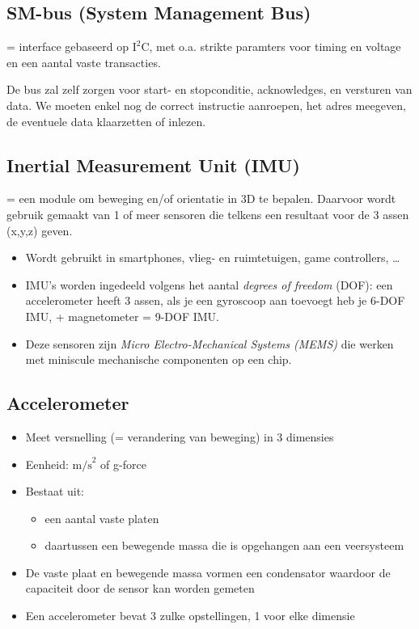 \documentclass{article}
\begin{document}
\subsection{SM-bus (System Management Bus)}
= interface gebaseerd op $\text{I}^2\text{C}$, met o.a. strikte paramters voor timing en voltage en een aantal vaste transacties.

De bus zal zelf zorgen voor start- en stopconditie, acknowledges, en versturen van data. 
We moeten enkel nog de correct instructie aanroepen, het adres meegeven, de eventuele data klaarzetten of inlezen.

\subsection{Inertial Measurement Unit (IMU)}
= een module om beweging en/of orientatie in 3D te bepalen. 
Daarvoor wordt gebruik gemaakt van 1 of meer sensoren die telkens een resultaat voor de 3 assen (x,y,z) geven.

\begin{itemize}
    \item Wordt gebruikt in smartphones, vlieg- en ruimtetuigen, game controllers, \dots
    \item IMU's worden ingedeeld volgens het aantal \textit{degrees of freedom} (DOF):
    een accelerometer heeft 3 assen, als je een gyroscoop aan toevoegt heb je 6-DOF IMU, + magnetometer = 9-DOF IMU.
    \item Deze sensoren zijn \textit{Micro Electro-Mechanical Systems (MEMS)} die werken met miniscule mechanische componenten op een chip.
\end{itemize}

\subsection{Accelerometer}
\begin{itemize}
    \item Meet versnelling (= verandering van beweging) in 3 dimensies
    \item Eenheid: $\text{m/s}^2$ of g-force
    \item Bestaat uit:
    \begin{itemize}
        \item een aantal vaste platen
        \item daartussen een bewegende massa die is opgehangen aan een veersysteem
    \end{itemize}
    \item De vaste plaat en bewegende massa vormen een condensator waardoor de capaciteit door de sensor kan worden gemeten
    \item Een accelerometer bevat 3 zulke opstellingen, 1 voor elke dimensie
\end{itemize}
\end{document}
